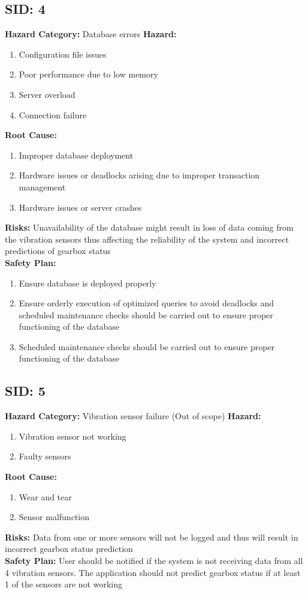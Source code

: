 \subsection{SID: 4}		
\textbf{Hazard Category:} Database errors
\textbf{Hazard:}
\begin{enumerate}
	\item Configuration file issues
	\item Poor performance due to low memory
	\item Server overload
	\item Connection failure
\end{enumerate}
\textbf{Root Cause:}
\begin{enumerate}
	\item Improper database deployment
	\item Hardware issues or deadlocks arising due to improper transaction management
	\item Hardware issues or server crashes
\end{enumerate}
\textbf{Risks:} Unavailability of the database might result in loss of data coming from the vibration sensors thus affecting the reliability of the system and incorrect predictions of gearbox status\\
\textbf{Safety Plan:}
\begin{enumerate}
	\item Ensure database is deployed properly
	\item Ensure orderly execution of optimized queries to avoid deadlocks and scheduled maintenance checks should be carried out to ensure proper functioning of the database
	\item Scheduled maintenance checks should be carried out to ensure proper functioning of the database
\end{enumerate}

\subsection{SID: 5}		
\textbf{Hazard Category:} Vibration sensor failure (Out of scope)
\textbf{Hazard:}
\begin{enumerate}
	\item Vibration sensor not working
	\item Faulty sensors
\end{enumerate}
\textbf{Root Cause:}
\begin{enumerate}
	\item Wear and tear
	\item Sensor malfunction
\end{enumerate}
\textbf{Risks:}  Data from one or more sensors will not be logged and thus will result in incorrect gearbox status prediction\\
\textbf{Safety Plan:}
User should be notified if the system is not receiving data from all 4 vibration sensors. The application should not predict gearbox status if at least 1 of the sensors are not working 


